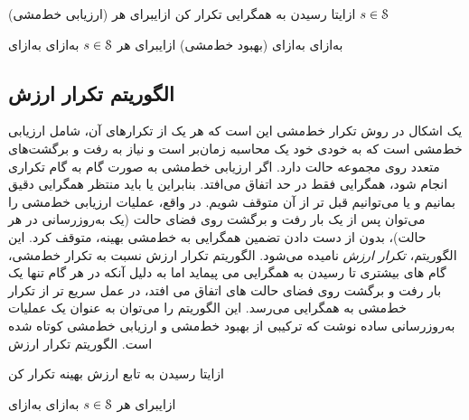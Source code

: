 (ارزیابی خط‌مشی)
‌ازای{تا رسیدن به همگرایی تکرار کن}
‌ازای{برای هر $s \in \EuScript{S}$}

‌به‌ازای
‌به‌ازای
(بهبود خط‌مشی)
‌ازای{برای هر $s \in \EuScript{S}$}
‌به‌ازای
‌به‌ازای
\subsection{الگوریتم تکرار ارزش}
یک اشکال در روش تکرار خط‌مشی این است که هر یک از تکرارهای آن، شامل ارزیابی خط‌مشی است که
به خودی خود یک محاسبه زمان‌بر است و نیاز به رفت و برگشت‌های متعدد روی مجموعه حالت دارد. اگر
ارزیابی خط‌مشی به صورت گام به گام تکراری انجام شود، همگرایی فقط در حد اتفاق می‌افتد. بنابراین یا باید منتظر همگرایی دقیق بمانیم و یا می‌توانیم قبل تر از آن متوقف شویم. 
در واقع، عملیات ارزیابی خط‌مشی را می‌توان پس از یک بار رفت و برگشت روی فضای حالت (یک به‌روزرسانی در هر حالت)،  بدون از دست دادن تضمین همگرایی به خط‌مشی بهینه، متوقف کرد. 
این الگوریتم،
\textit{تکرار ارزش}
 نامیده می‌شود. الگوریتم تکرار ارزش نسبت به تکرار خط‌مشی، گام های بیشتری تا رسیدن به همگرایی می پیماید اما به دلیل آنکه در هر گام تنها یک بار رفت و برگشت روی فضای حالت های اتفاق می افتد، در عمل سریع تر از تکرار خط‌مشی به همگرایی می‌رسد. این الگوریتم
را می‌توان به عنوان یک عملیات به‌روزرسانی ساده نوشت که ترکیبی از بهبود خط‌مشی و ارزیابی خط‌مشی کوتاه شده است.
{الگوریتم تکرار ارزش}

‌ازای{تا رسیدن به تابع ارزش بهینه تکرار کن}

‌ازای{برای هر $s \in \EuScript{S}$}
‌به‌ازای
‌به‌ازای
